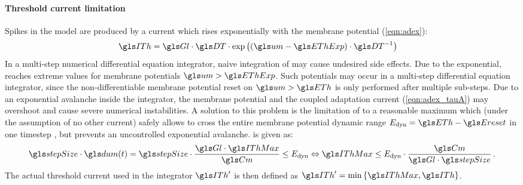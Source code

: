 \paragraph{Threshold current limitation}
Spikes in the \AdEx model are produced by a current \ITh which rises exponentially with the membrane potential \um (\cref{eqn:adex}):
\begin{align}
	\ITh &= \Gl \cdot \DT \cdot \exp \left((\um - \EThExp) \cdot \DT^{-1}\right)
	\label{eqn:threshold_current}
\end{align}
In a multi-step numerical differential equation integrator, naive integration of \ITh may cause undesired side effects. Due to the exponential, \ITh reaches extreme values for membrane potentials $\um > \EThExp$. Such potentials may occur in a multi-step differential equation integrator, since the non-differentiable membrane potential reset on $\um > \ETh$ is only performed after multiple sub-steps. Due to an exponential avalanche inside the integrator, the membrane potential \um and the coupled adaptation current \iadap (\cref{eqn:adex_tauA}) may overshoot and cause severe numerical instabilities. A solution to this problem is the limitation of \ITh to a reasonable maximum \IThMax which (under the assumption of no other current) safely allows to cross the entire membrane potential dynamic range $E_\mathrm{dyn} = \ETh - \Ereset$ in one timestep \stepSize, but prevents an uncontrolled exponential avalanche. \IThMax is given as:
\begin{align}
	\stepSize \cdot \dum(t) = \stepSize \cdot \frac{\Gl \cdot \IThMax}{\Cm} \leq E_\mathrm{dyn} \Leftrightarrow \IThMax \leq E_\mathrm{dyn} \cdot \frac{\Cm}{\Gl \cdot \stepSize} \,.
\end{align}
The actual threshold current used in the integrator $\ITh'$ is then defined as $\ITh' = \min\left\{\IThMax, \ITh\right\}$.

